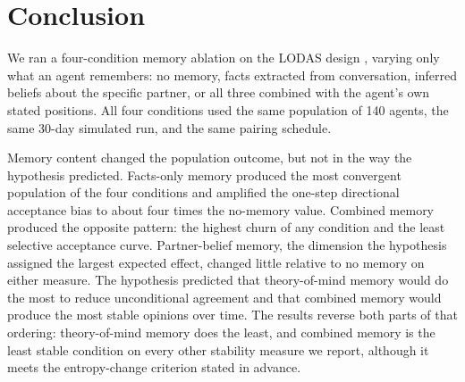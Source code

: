 \documentclass[11pt,a4paper]{article}
\begin{document}

\section{Conclusion}\label{sec:8}

We ran a four-condition memory ablation on the LODAS design \citep{cau2025selective}, varying only what an agent remembers: no memory, facts extracted from conversation, inferred beliefs about the specific partner, or all three combined with the agent's own stated positions. All four conditions used the same population of 140 agents, the same 30-day simulated run, and the same pairing schedule.

Memory content changed the population outcome, but not in the way the hypothesis predicted. Facts-only memory produced the most convergent population of the four conditions and amplified the one-step directional acceptance bias to about four times the no-memory value. Combined memory produced the opposite pattern: the highest churn of any condition and the least selective acceptance curve. Partner-belief memory, the dimension the hypothesis assigned the largest expected effect, changed little relative to no memory on either measure. The hypothesis predicted that theory-of-mind memory would do the most to reduce unconditional agreement and that combined memory would produce the most stable opinions over time. The results reverse both parts of that ordering: theory-of-mind memory does the least, and combined memory is the least stable condition on every other stability measure we report, although it meets the entropy-change criterion stated in advance.
\end{document}
